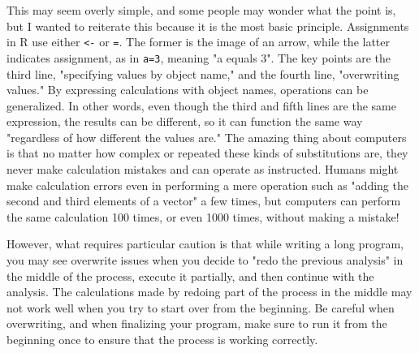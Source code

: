 \documentclass{ltjsbook}
\begin{document}
This may seem overly simple, and some people may wonder what the point is, but I wanted to reiterate this because it is the most basic principle. Assignments in R use either \verb|<-| or \verb|=|. The former is the image of an arrow, while the latter indicates assignment, as in \verb|a=3|, meaning "a equals 3".
The key points are the third line, "specifying values by object name," and the fourth line, "overwriting values." By expressing calculations with object names, operations can be generalized. In other words, even though the third and fifth lines are the same expression, the results can be different, so it can function the same way "regardless of how different the values are." The amazing thing about computers is that no matter how complex or repeated these kinds of substitutions are, they never make calculation mistakes and can operate as instructed. Humans might make calculation errors even in performing a mere operation such as "adding the second and third elements of a vector" a few times, but computers can perform the same calculation 100 times, or even 1000 times, without making a mistake!

However, what requires particular caution is that while writing a long program, you may see overwrite issues when you decide to "redo the previous analysis" in the middle of the process, execute it partially, and then continue with the analysis. The calculations made by redoing part of the process in the middle may not work well when you try to start over from the beginning. Be careful when overwriting, and when finalizing your program, make sure to run it from the beginning once to ensure that the process is working correctly.
\end{document}
